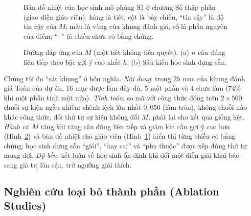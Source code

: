 \documentclass[10pt,a4paper,twocolumn]{article}
\begin{document}
\begin{figure}[t]
\centering

\caption{Bản đồ nhiệt của học sinh mô phỏng S1 ở chương Số thập phân (giao diện giáo viên): hàng là tiết, cột là bảy chiều, ``tin cậy'' là độ tin cậy của $M$; màu là vùng của khung đánh giá, số là phần nguyên của điểm; ``--'' là chiều chưa có bằng chứng.}\label{fig:heat}
\end{figure}

\begin{figure}[t]
\centering

\caption{Đường đáp ứng của $M$ (một tiết không tiên quyết). (a) $n$ câu đúng liên tiếp theo bậc gợi ý cao nhất $h$. (b) Sáu kiểu học sinh dựng sẵn.}\label{fig:curves}
\end{figure}
Chúng tôi đo ``sát khung'' ở bốn nghĩa. \emph{Nội dung}: trong $25$ mục của khung đánh giá Toán của dự án, $16$ mục được làm đầy đủ, $5$ một phần và $4$ chưa làm ($74\%$ khi một phần tính một nửa). \emph{Tính toán}: so mã với công thức đóng trên $2\times500$ chuỗi sự kiện ngẫu nhiên: chênh lệch lớn nhất $0{,}050$ (làm tròn), không chuỗi nào khác công thức, đổi thứ tự sự kiện không đổi $M$, phát lại cho kết quả giống hệt. \emph{Hành vi}: $M$ tăng khi tăng câu đúng liên tiếp và giảm khi cần gợi ý cao hơn (Hình~\ref{fig:curves}) và bản đồ nhiệt cho giáo viên (Hình~\ref{fig:heat}) hiển thị từng chiều có bằng chứng; học sinh dựng sẵn ``giỏi'', ``hay sai'' và ``phụ thuộc'' được xếp đúng thứ tự mong đợi. \emph{Độ bền}: kết luận về học sinh ổn định khi đổi một diễn giải khai báo sang giá trị lân cận, trừ ngưỡng giải thích.

\subsection{Nghiên cứu loại bỏ thành phần (Ablation Studies)}\label{sec:ablation}
\end{document}
